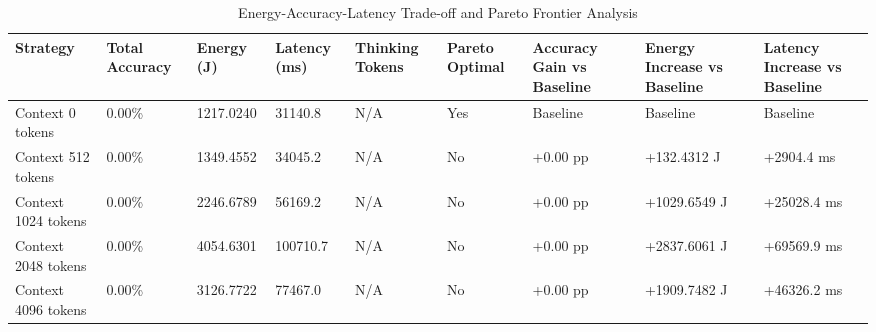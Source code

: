 \begin{table}
\caption{Energy-Accuracy-Latency Trade-off and Pareto Frontier Analysis}
\label{tab:tradeoff_comparison}
\begin{tabular}{lllllllll}
\toprule
Strategy & Total Accuracy & Energy (J) & Latency (ms) & Thinking Tokens & Pareto Optimal & Accuracy Gain vs Baseline & Energy Increase vs Baseline & Latency Increase vs Baseline \\
\midrule
Context 0 tokens & 0.00\% & 1217.0240 & 31140.8 & N/A & Yes & Baseline & Baseline & Baseline \\
Context 512 tokens & 0.00\% & 1349.4552 & 34045.2 & N/A & No & +0.00 pp & +132.4312 J & +2904.4 ms \\
Context 1024 tokens & 0.00\% & 2246.6789 & 56169.2 & N/A & No & +0.00 pp & +1029.6549 J & +25028.4 ms \\
Context 2048 tokens & 0.00\% & 4054.6301 & 100710.7 & N/A & No & +0.00 pp & +2837.6061 J & +69569.9 ms \\
Context 4096 tokens & 0.00\% & 3126.7722 & 77467.0 & N/A & No & +0.00 pp & +1909.7482 J & +46326.2 ms \\
\bottomrule
\end{tabular}
\end{table}
